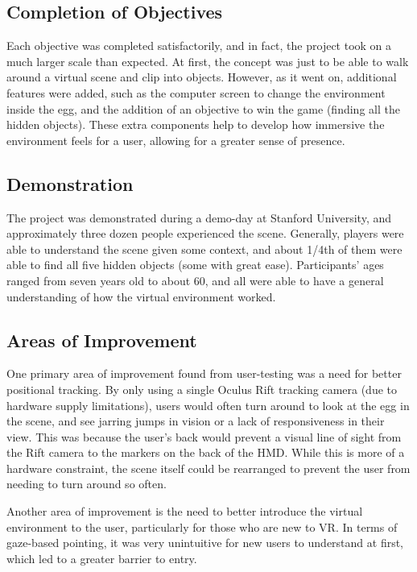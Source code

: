 \documentclass[10pt,twocolumn,letterpaper]{article}
\begin{document}
\subsection{Completion of Objectives}

Each objective was completed satisfactorily, and in fact, the project took on a much larger scale than expected. At first, the concept was just to be able to walk around a virtual scene and clip into objects. However, as it went on, additional features were added, such as the computer screen to change the environment inside the egg, and the addition of an objective to win the game (finding all the hidden objects). These extra components help to develop how immersive the environment feels for a user, allowing for a greater sense of presence.

\subsection{Demonstration}

The project was demonstrated during a demo-day at Stanford University, and approximately three dozen people experienced the scene. Generally, players were able to understand the scene given some context, and about 1/4th of them were able to find all five hidden objects (some with great ease). Participants' ages ranged from seven years old to about 60, and all were able to have a general understanding of how the virtual environment worked.

\subsection{Areas of Improvement}

One primary area of improvement found from user-testing was a need for better positional tracking. By only using a single Oculus Rift tracking camera (due to hardware supply limitations), users would often turn around to look at the egg in the scene, and see jarring jumps in vision or a lack of responsiveness in their view. This was because the user's back would prevent a visual line of sight from the Rift camera to the markers on the back of the HMD. While this is more of a hardware constraint, the scene itself could be rearranged to prevent the user from needing to turn around so often.

Another area of improvement is the need to better introduce the virtual environment to the user, particularly for those who are new to VR. In terms of gaze-based pointing, it was very unintuitive for new users to understand at first, which led to a greater barrier to entry.
\end{document}
